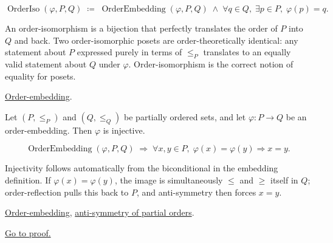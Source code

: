 \begin{remark*}
\[
\operatorname{OrderIso}(\varphi, P, Q)
\;\coloneqq\;
\operatorname{OrderEmbedding}(\varphi, P, Q)
\;\land\;
\forall q \in Q,\; \exists p \in P,\; \varphi(p) = q.
\]
\end{remark*}

\begin{remark*}[Interpretation]
An order-isomorphism is a bijection that perfectly translates the order
of $P$ into $Q$ and back.  Two order-isomorphic posets are
order-theoretically identical: any statement about $P$ expressed purely
in terms of $\leq_P$ translates to an equally valid statement about $Q$
under $\varphi$.  Order-isomorphism is the correct notion of equality
for posets.
\end{remark*}

\begin{remark*}[Dependencies]
\hyperref[def:order-embedding]{Order-embedding}.
\end{remark*}


\begin{lemma}
\label{lem:order-embedding-injective}
Let $(P, \leq_P)$ and $(Q, \leq_Q)$ be partially ordered sets, and let
$\varphi : P \to Q$ be an order-embedding.  Then $\varphi$ is injective.
\end{lemma}

\begin{remark*}
\[
\operatorname{OrderEmbedding}(\varphi, P, Q)
\;\Longrightarrow\;
\forall x, y \in P,\; \varphi(x) = \varphi(y) \Rightarrow x = y.
\]
\end{remark*}

\begin{remark*}[Interpretation]
Injectivity follows automatically from the biconditional in the embedding
definition.  If $\varphi(x) = \varphi(y)$, the image is simultaneously
$\leq$ and $\geq$ itself in $Q$; order-reflection pulls this back to $P$,
and anti-symmetry then forces $x = y$.
\end{remark*}

\begin{remark*}[Dependencies]
\hyperref[def:order-embedding]{Order-embedding},
\hyperref[def:partial-order]{anti-symmetry of partial orders}.
\end{remark*}

\begin{remark*}[Proof]
\hyperref[prf:order-embedding-injective]{Go to proof.}
\end{remark*}
